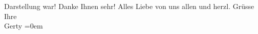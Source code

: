 \begin{ledgroupsized}[t]{13cm}
                    Darstellung war! Danke Ihnen sehr!\pend
           \pstart
           Alles Liebe von uns allen und herzl. Grüsse{\\[\baselineskip]}Ihre{\\[\baselineskip]}\spacefill\mbox{Gerty}\pend
           \leftskip=0em{}\endnumbering{}\end{ledgroupsized}  \newcommand{\dateiname}{L02529}\newcommand{\titel}{Gerty von Hofmannsthal an Arthur Schnitzler, 2. 1. 1930}\newcommand{\editorInnen}{Martin Anton Müller und Gerd-Hermann Susen}
      